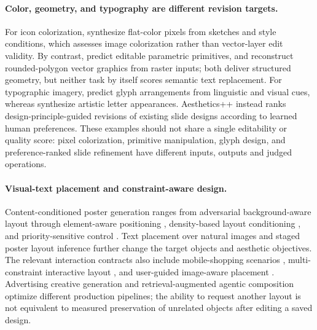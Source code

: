 \paragraph{Color, geometry, and typography are different revision targets.}
For icon colorization, \citet{li2022iconcolorization} synthesize flat-color pixels from sketches and style conditions, which assesses image colorization rather than vector-layer edit validity.
By contrast, \citet{chen2023primitiveassembly} predict editable parametric primitives, and \citet{gehlaut2026vectorark} reconstruct rounded-polygon vector graphics from raster inputs; both deliver structured geometry, but neither task by itself scores semantic text replacement.
For typographic imagery, \citet{wang2022textlogo} predict glyph arrangements from linguistic and visual cues, whereas \citet{wang2023anythingtoglyph} synthesize artistic letter appearances.
Aesthetics++ \citep{kong2023aestheticspp} instead ranks design-principle-guided revisions of existing slide designs according to learned human preferences.
These examples should not share a single editability or quality score: pixel colorization, primitive manipulation, glyph design, and preference-ranked slide refinement have different inputs, outputs and judged operations.

\paragraph{Visual-text placement and constraint-aware design.}
Content-conditioned poster generation ranges from adversarial background-aware layout \citep{zheng2019contentgan} through element-aware positioning \citep{li2024designelementposter}, density-based layout conditioning \citep{hsu2023densitylayout}, and priority-sensitive control \citep{yang2026priorityposter}.
Text placement over natural images \citep{li2022smarttext} and staged poster layout inference \citep{chai2023twostageposter} further change the target objects and aesthetic objectives.
The relevant interaction contracts also include mobile-shopping scenarios \citep{jing2023mobilshopping}, multi-constraint interactive layout \citep{chen2024iris}, and user-guided image-aware placement \citep{xu2025imageaware}.
Advertising creative generation \citep{wang2022creagan} and retrieval-augmented agentic composition \citep{forouzandehmehr2025calrag} optimize different production pipelines; the ability to request another layout is not equivalent to measured preservation of unrelated objects after editing a saved design.

